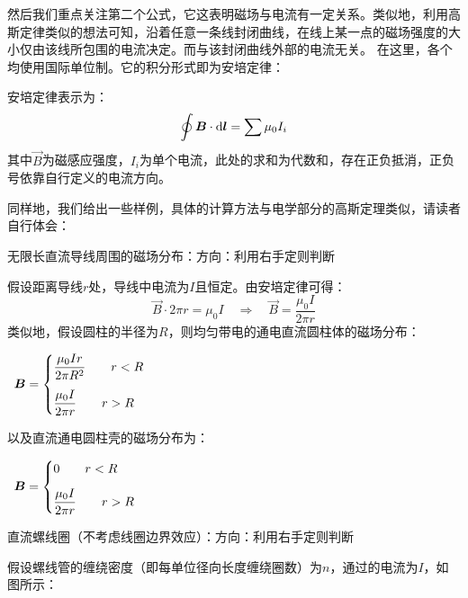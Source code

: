 然后我们重点关注第二个公式，它这表明磁场与电流有一定关系。类似地，利用高斯定律类似的想法可知，沿着任意一条线封闭曲线，在线上某一点的磁场强度的大小仅由该线所包围的电流决定。而与该封闭曲线外部的电流无关。
在这里，各个均使用国际单位制。它的积分形式即为安培定律：
\begin{law}
    安培定律表示为：
    \[\oint \vec{B}\cdot\dif{\vec{l}}=\sum\mu_0 I_i\]
    其中$\vec{B}$为磁感应强度，$I_i$为单个电流，此处的求和为代数和，存在正负抵消，正负号依靠自行定义的电流方向。
\end{law}

同样地，我们给出一些样例，具体的计算方法与电学部分的高斯定理类似，请读者自行体会：
\begin{Itemize}
    \item 无限长直流导线周围的磁场分布：方向：利用右手定则判断\par
    假设距离导线$r$处，导线中电流为$I$且恒定。由安培定律可得：
    \[\vec{B}\cdot2\pi r=\mu_0 I\quad\Rightarrow\quad\vec{B}=\dfrac{\mu_0I}{2\pi r}\]
    类似地，假设圆柱的半径为$R$，则均匀带电的通电直流圆柱体的磁场分布：
    \begin{center}
        $\begin{array}{c}
        \Vec{B}= 
        \begin{cases}
            \vspace{3mm}
            \dfrac{\mu_0Ir}{2\pi R^2}\qquad r<R\\
            \dfrac{\mu_0 I}{2\pi r}\qquad r>R\\
        \end{cases} 
        \end{array}$
    \end{center}
    以及直流通电圆柱壳的磁场分布为：
    \begin{center}
        $\begin{array}{c}
        \Vec{B}= 
        \begin{cases}
            \vspace{3mm}
            0\qquad r<R\\
            \dfrac{\mu_0 I}{2\pi r}\qquad r>R\\
        \end{cases} 
        \end{array}$
    \end{center}
    \item 直流螺线圈（不考虑线圈边界效应）：方向：利用右手定则判断\par
    假设螺线管的缠绕密度（即每单位径向长度缠绕圈数）为$n$，通过的电流为$I$，如图所示：

\end{Itemize}
